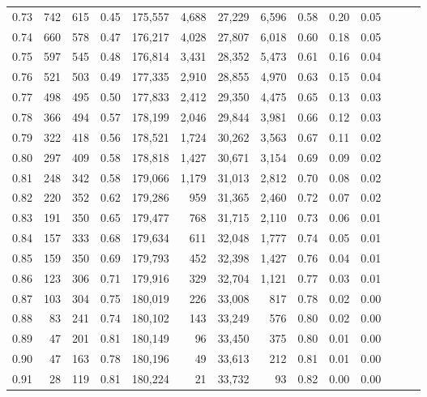 \begin{tabular}{rrrrrrrrrrrrrr}
0.73 &    742 &  615 &  0.45 &  175,557 &    4,688 &  27,229 &   6,596 &  0.58 &  0.20 &      0.05 \\
0.74 &    660 &  578 &  0.47 &  176,217 &    4,028 &  27,807 &   6,018 &  0.60 &  0.18 &      0.05 \\
0.75 &    597 &  545 &  0.48 &  176,814 &    3,431 &  28,352 &   5,473 &  0.61 &  0.16 &      0.04 \\
0.76 &    521 &  503 &  0.49 &  177,335 &    2,910 &  28,855 &   4,970 &  0.63 &  0.15 &      0.04 \\
0.77 &    498 &  495 &  0.50 &  177,833 &    2,412 &  29,350 &   4,475 &  0.65 &  0.13 &      0.03 \\
0.78 &    366 &  494 &  0.57 &  178,199 &    2,046 &  29,844 &   3,981 &  0.66 &  0.12 &      0.03 \\
0.79 &    322 &  418 &  0.56 &  178,521 &    1,724 &  30,262 &   3,563 &  0.67 &  0.11 &      0.02 \\
0.80 &    297 &  409 &  0.58 &  178,818 &    1,427 &  30,671 &   3,154 &  0.69 &  0.09 &      0.02 \\
0.81 &    248 &  342 &  0.58 &  179,066 &    1,179 &  31,013 &   2,812 &  0.70 &  0.08 &      0.02 \\
0.82 &    220 &  352 &  0.62 &  179,286 &      959 &  31,365 &   2,460 &  0.72 &  0.07 &      0.02 \\
0.83 &    191 &  350 &  0.65 &  179,477 &      768 &  31,715 &   2,110 &  0.73 &  0.06 &      0.01 \\
0.84 &    157 &  333 &  0.68 &  179,634 &      611 &  32,048 &   1,777 &  0.74 &  0.05 &      0.01 \\
0.85 &    159 &  350 &  0.69 &  179,793 &      452 &  32,398 &   1,427 &  0.76 &  0.04 &      0.01 \\
0.86 &    123 &  306 &  0.71 &  179,916 &      329 &  32,704 &   1,121 &  0.77 &  0.03 &      0.01 \\
0.87 &    103 &  304 &  0.75 &  180,019 &      226 &  33,008 &     817 &  0.78 &  0.02 &      0.00 \\
0.88 &     83 &  241 &  0.74 &  180,102 &      143 &  33,249 &     576 &  0.80 &  0.02 &      0.00 \\
0.89 &     47 &  201 &  0.81 &  180,149 &       96 &  33,450 &     375 &  0.80 &  0.01 &      0.00 \\
0.90 &     47 &  163 &  0.78 &  180,196 &       49 &  33,613 &     212 &  0.81 &  0.01 &      0.00 \\
0.91 &     28 &  119 &  0.81 &  180,224 &       21 &  33,732 &      93 &  0.82 &  0.00 &      0.00 \\

\end{tabular}
